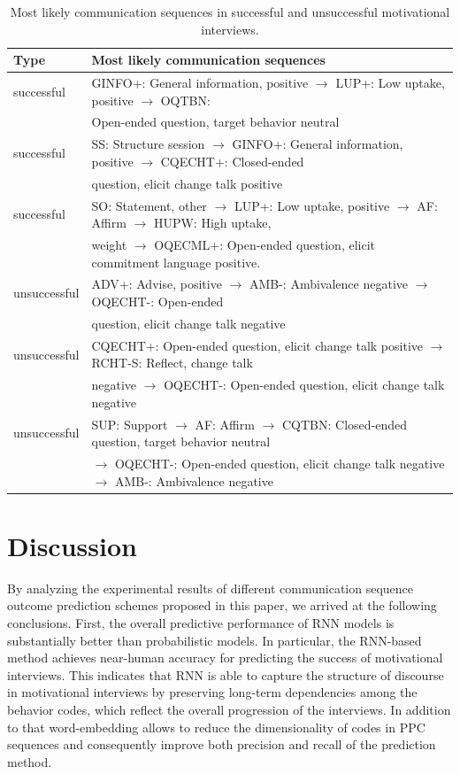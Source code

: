 \documentclass{amia_summit_2018}
\begin{document}
\begin{table}[h]
\centering
\caption{Most likely communication sequences in successful and unsuccessful motivational interviews.}
\label{tab:common_patterns}
  \begin{tabular}{|l|l|}
  \hline
   \textbf{Type} & \textbf{Most likely communication sequences} \\ \hline      
successful & GINFO+: General information, positive $\rightarrow $ LUP+: Low uptake, positive $\rightarrow $ OQTBN: \\ 
& Open-ended question, target behavior neutral \\\hline
successful & SS: Structure session $\rightarrow $ GINFO+: General information, positive $\rightarrow $ CQECHT+: Closed-ended \\
& question, elicit change talk positive\\\hline
successful & SO: Statement, other $\rightarrow $ LUP+: Low uptake, positive $\rightarrow $ AF: Affirm $\rightarrow $ HUPW: High uptake, \\
& weight $\rightarrow $ OQECML+: Open-ended question, elicit commitment language positive. \\\hline
unsuccessful & ADV+: Advise, positive $\rightarrow $ AMB-: Ambivalence negative $\rightarrow $ OQECHT-: Open-ended \\
& question, elicit change talk negative\\\hline
unsuccessful & CQECHT+: Open-ended question, elicit change talk positive $\rightarrow $ RCHT-S: Reflect, change talk \\
& negative $\rightarrow $ OQECHT-: Open-ended question, elicit change talk negative \\\hline
unsuccessful & SUP: Support $\rightarrow $ AF: Affirm $\rightarrow $ CQTBN: Closed-ended question, target behavior neutral \\
& $\rightarrow $ OQECHT-: Open-ended question, elicit change talk negative $\rightarrow $ AMB-: Ambivalence negative\\\hline
  \end{tabular}
\end{table} 

\section*{Discussion}
By analyzing the experimental results of different communication sequence outcome prediction schemes proposed in this paper, we arrived at the following conclusions. First, the overall predictive performance of RNN models is substantially better than probabilistic models. In particular, the RNN-based method achieves near-human accuracy for predicting the success of motivational interviews. This indicates that RNN is able to capture the structure of discourse in motivational interviews by preserving long-term dependencies among the behavior codes, which reflect the overall progression of the interviews. In addition to that word-embedding allows to reduce the dimensionality of codes in PPC sequences and consequently improve both precision and recall of the prediction method. 
\end{document}
